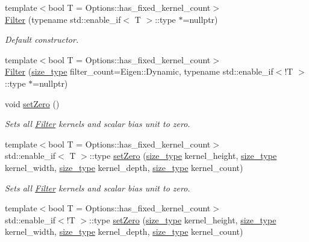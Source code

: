\begin{DoxyCompactItemize}
\item 
{\footnotesize template$<$bool T = Options\-::has\-\_\-fixed\-\_\-kernel\-\_\-count$>$ }\\\hyperlink{classffnn_1_1layer_1_1convolution_1_1_filter_a92680fc95854201cf47f44ffb91e17e9}{Filter} (typename std\-::enable\-\_\-if$<$ T $>$\-::type $\ast$=nullptr)
\begin{DoxyCompactList}\small\item\em Default constructor. \end{DoxyCompactList}\item 
{\footnotesize template$<$bool T = Options\-::has\-\_\-fixed\-\_\-kernel\-\_\-count$>$ }\\\hyperlink{classffnn_1_1layer_1_1convolution_1_1_filter_ae4efedce4c1e0470bb144b5a1b115465}{Filter} (\hyperlink{namespaceffnn_a63b90a2fd70eb76684eac482a51633e5}{size\-\_\-type} filter\-\_\-count=Eigen\-::\-Dynamic, typename std\-::enable\-\_\-if$<$!T $>$\-::type $\ast$=nullptr)
\item 
void \hyperlink{classffnn_1_1layer_1_1convolution_1_1_filter_adba3235a36053b7f669c68691a38e804}{set\-Zero} ()
\begin{DoxyCompactList}\small\item\em Sets all \hyperlink{classffnn_1_1layer_1_1convolution_1_1_filter}{Filter} kernels and scalar bias unit to zero. \end{DoxyCompactList}\item 
{\footnotesize template$<$bool T = Options\-::has\-\_\-fixed\-\_\-kernel\-\_\-count$>$ }\\std\-::enable\-\_\-if$<$ T $>$\-::type \hyperlink{classffnn_1_1layer_1_1convolution_1_1_filter_ae965817157c5b968ebb045df1c96ee38}{set\-Zero} (\hyperlink{namespaceffnn_a63b90a2fd70eb76684eac482a51633e5}{size\-\_\-type} kernel\-\_\-height, \hyperlink{namespaceffnn_a63b90a2fd70eb76684eac482a51633e5}{size\-\_\-type} kernel\-\_\-width, \hyperlink{namespaceffnn_a63b90a2fd70eb76684eac482a51633e5}{size\-\_\-type} kernel\-\_\-depth, \hyperlink{namespaceffnn_a63b90a2fd70eb76684eac482a51633e5}{size\-\_\-type} kernel\-\_\-count)
\begin{DoxyCompactList}\small\item\em Sets all \hyperlink{classffnn_1_1layer_1_1convolution_1_1_filter}{Filter} kernels and scalar bias unit to zero. \end{DoxyCompactList}\item 
{\footnotesize template$<$bool T = Options\-::has\-\_\-fixed\-\_\-kernel\-\_\-count$>$ }\\std\-::enable\-\_\-if$<$!T $>$\-::type \hyperlink{classffnn_1_1layer_1_1convolution_1_1_filter_aa9a4f44db1cc39b2f142f5065a3f470f}{set\-Zero} (\hyperlink{namespaceffnn_a63b90a2fd70eb76684eac482a51633e5}{size\-\_\-type} kernel\-\_\-height, \hyperlink{namespaceffnn_a63b90a2fd70eb76684eac482a51633e5}{size\-\_\-type} kernel\-\_\-width, \hyperlink{namespaceffnn_a63b90a2fd70eb76684eac482a51633e5}{size\-\_\-type} kernel\-\_\-depth, \hyperlink{namespaceffnn_a63b90a2fd70eb76684eac482a51633e5}{size\-\_\-type} kernel\-\_\-count)

\end{DoxyCompactItemize}
